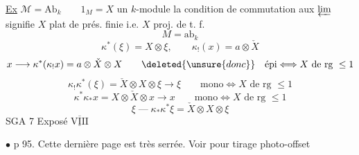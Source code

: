 \uline{Ex} $\mathcal M=\mathrm{Ab}_k\qquad1_M=X$ un $k$-module
la condition de commutation  aux $\varprojlim$
signifie
$X$ plat de prés. finie i.e. $X$ proj. de t. f.
\[
M=\mathrm{ab}_k
\]
\[
\kappa^*(\xi)=X\otimes\xi,\qquad\kappa_!(x)=a\otimes\check X
\]
\[
x\longrightarrow\kappa^*(\kappa_!x)=a\otimes\check X\otimes X
\qquad\deleted{\unsure{donc}}\quad\text{épi}\Longleftrightarrow X\text{ de rg }\leq1
\]
\[
\kappa_!\kappa^*(\xi)=\check X\otimes X\otimes\xi\longrightarrow\xi
\qquad\text{mono}\Longleftrightarrow X\text{ de rg }\leq1
\]
\[
\kappa^*\kappa_*x=X\otimes\check X\otimes x\longrightarrow x
\qquad\text{mono}\Longleftrightarrow X\text{ de rg }\leq1
\]
\[
\xi\mathbin{\text{---}}\kappa_*\kappa^*\xi=\check X\otimes X\otimes\xi
\]
SGA 7 Exposé $\overline{\underline{\mathrm{VIII}}}$

$\bullet$ p 95. Cette dernière page est très serrée. Voir pour tirage photo-offset

